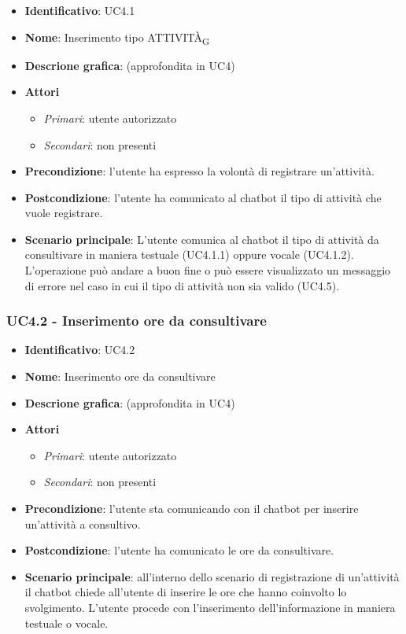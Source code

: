 \begin{itemize}
    \item \textbf{Identificativo}: UC4.1 
    \item \textbf{Nome}: Inserimento tipo ATTIVITÀ\textsubscript{G} 
    \item \textbf{Descrione grafica}: (approfondita in UC4)
    \item \textbf{Attori}
        \begin{itemize} 
            \item \textit{Primari}: utente autorizzato
            \item \textit{Secondari}: non presenti
        \end{itemize}
    \item \textbf{Precondizione}: l'utente ha espresso la volontà di registrare un'attività. 
    \item \textbf{Postcondizione}: l'utente ha comunicato al chatbot il tipo di attività che vuole registrare. 
    \item \textbf{Scenario principale}: L'utente comunica al chatbot il tipo di attività da consultivare in maniera testuale (UC4.1.1) oppure vocale (UC4.1.2). L'operazione può andare a buon fine o può essere visualizzato un messaggio di errore nel caso in cui il tipo di attività non sia valido (UC4.5).
\end{itemize}

\subsubsection{UC4.2 - Inserimento ore da consultivare}
\begin{itemize}
    \item \textbf{Identificativo}: UC4.2 
    \item \textbf{Nome}: Inserimento ore da consultivare  
    \item \textbf{Descrione grafica}: (approfondita in UC4)
    \item \textbf{Attori}
        \begin{itemize} 
            \item \textit{Primari}: utente autorizzato
            \item \textit{Secondari}: non presenti
        \end{itemize}
    \item \textbf{Precondizione}: l'utente sta comunicando con il chatbot per inserire un'attività a consultivo. 
    \item \textbf{Postcondizione}: l'utente ha comunicato le ore da consultivare. 
    \item \textbf{Scenario principale}: all'interno dello scenario di registrazione di un'attività il chatbot chiede all'utente di inserire le ore che hanno coinvolto lo svolgimento. L'utente procede con l'inserimento dell'informazione in maniera testuale o vocale. 
\end{itemize}
\newpage

